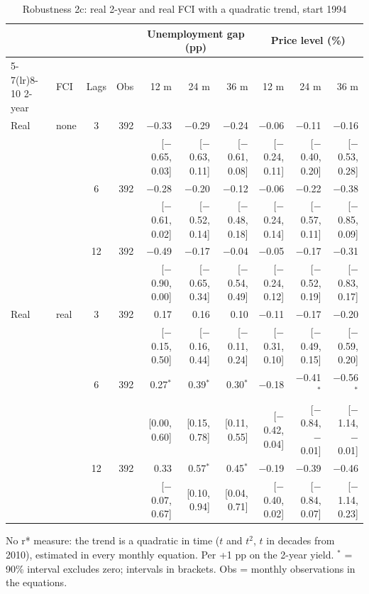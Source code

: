 \begin{table}[p]\centering\footnotesize\setlength{\tabcolsep}{2.2pt}
\caption{Robustness 2c: real 2-year and real FCI with a quadratic trend, start 1994}\label{tab:R2c}
\begin{tabular}{llcrrrrrrr}\toprule
 & & & & \multicolumn{3}{c}{Unemployment gap (pp)} & \multicolumn{3}{c}{Price level (\%)}\\ \cmidrule(lr){5-7}\cmidrule(lr){8-10}
2-year & FCI & Lags & Obs & 12 m & 24 m & 36 m & 12 m & 24 m & 36 m\\ \midrule
Real & none & 3 & 392 & $-$0.33 & $-$0.29 & $-$0.24 & $-$0.06 & $-$0.11 & $-$0.16\\
 & & & & {\scriptsize [$-$0.65, 0.03]} & {\scriptsize [$-$0.63, 0.11]} & {\scriptsize [$-$0.61, 0.08]} & {\scriptsize [$-$0.24, 0.11]} & {\scriptsize [$-$0.40, 0.20]} & {\scriptsize [$-$0.53, 0.28]}\\
 &  & 6 & 392 & $-$0.28 & $-$0.20 & $-$0.12 & $-$0.06 & $-$0.22 & $-$0.38\\
 & & & & {\scriptsize [$-$0.61, 0.02]} & {\scriptsize [$-$0.52, 0.14]} & {\scriptsize [$-$0.48, 0.18]} & {\scriptsize [$-$0.24, 0.14]} & {\scriptsize [$-$0.57, 0.11]} & {\scriptsize [$-$0.85, 0.09]}\\
 &  & 12 & 392 & $-$0.49 & $-$0.17 & $-$0.04 & $-$0.05 & $-$0.17 & $-$0.31\\
 & & & & {\scriptsize [$-$0.90, 0.00]} & {\scriptsize [$-$0.65, 0.34]} & {\scriptsize [$-$0.54, 0.49]} & {\scriptsize [$-$0.24, 0.12]} & {\scriptsize [$-$0.52, 0.19]} & {\scriptsize [$-$0.83, 0.17]}\\
Real & real & 3 & 392 & 0.17 & 0.16 & 0.10 & $-$0.11 & $-$0.17 & $-$0.20\\
 & & & & {\scriptsize [$-$0.15, 0.50]} & {\scriptsize [$-$0.16, 0.44]} & {\scriptsize [$-$0.11, 0.24]} & {\scriptsize [$-$0.31, 0.10]} & {\scriptsize [$-$0.49, 0.15]} & {\scriptsize [$-$0.59, 0.20]}\\
 &  & 6 & 392 & 0.27$^{*}$ & 0.39$^{*}$ & 0.30$^{*}$ & $-$0.18 & $-$0.41$^{*}$ & $-$0.56$^{*}$\\
 & & & & {\scriptsize [0.00, 0.60]} & {\scriptsize [0.15, 0.78]} & {\scriptsize [0.11, 0.55]} & {\scriptsize [$-$0.42, 0.04]} & {\scriptsize [$-$0.84, $-$0.01]} & {\scriptsize [$-$1.14, $-$0.01]}\\
 &  & 12 & 392 & 0.33 & 0.57$^{*}$ & 0.45$^{*}$ & $-$0.19 & $-$0.39 & $-$0.46\\
 & & & & {\scriptsize [$-$0.07, 0.67]} & {\scriptsize [0.10, 0.94]} & {\scriptsize [0.04, 0.71]} & {\scriptsize [$-$0.40, 0.02]} & {\scriptsize [$-$0.84, 0.07]} & {\scriptsize [$-$1.14, 0.23]}\\
\bottomrule\end{tabular}
\par\smallskip\parbox{0.96\linewidth}{\scriptsize No r* measure: the trend is a quadratic in time ($t$ and $t^2$, $t$ in decades from 2010), estimated in every monthly equation. Per +1 pp on the 2-year yield. $^{*}$ = 90\% interval excludes zero; intervals in brackets. Obs = monthly observations in the equations.}
\end{table}
